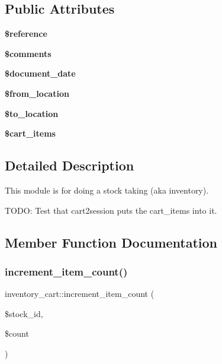 \subsection*{Public Attributes}
\begin{DoxyCompactItemize}
\item 
\hypertarget{classinventory__cart_adb6a248e9e7e1692096b86e0a46ea7d3}{}\label{classinventory__cart_adb6a248e9e7e1692096b86e0a46ea7d3} 
{\bfseries \$reference}
\item 
\hypertarget{classinventory__cart_afb8a0f36b69039235bce9a1533c52557}{}\label{classinventory__cart_afb8a0f36b69039235bce9a1533c52557} 
{\bfseries \$comments}
\item 
\hypertarget{classinventory__cart_aa6ec8ee5813e4dc2c5f4d4bcc86315cd}{}\label{classinventory__cart_aa6ec8ee5813e4dc2c5f4d4bcc86315cd} 
{\bfseries \$document\+\_\+date}
\item 
\hypertarget{classinventory__cart_a9f2fa9795e85409eb761c75010e7bf81}{}\label{classinventory__cart_a9f2fa9795e85409eb761c75010e7bf81} 
{\bfseries \$from\+\_\+location}
\item 
\hypertarget{classinventory__cart_a2e5e203494a0074bdee0b793b2cf38c1}{}\label{classinventory__cart_a2e5e203494a0074bdee0b793b2cf38c1} 
{\bfseries \$to\+\_\+location}
\item 
\hypertarget{classinventory__cart_a3612f3ff91eec58064ba266f07c501f9}{}\label{classinventory__cart_a3612f3ff91eec58064ba266f07c501f9} 
{\bfseries \$cart\+\_\+items}
\end{DoxyCompactItemize}


\subsection{Detailed Description}
This module is for doing a stock taking (aka inventory).

T\+O\+DO\+: Test that cart2session puts the cart\+\_\+items into it. 

\subsection{Member Function Documentation}
\hypertarget{classinventory__cart_af2060bcea0c8fd54ae0a2e5550a44935}{}\label{classinventory__cart_af2060bcea0c8fd54ae0a2e5550a44935} 
\subsubsection{\texorpdfstring{increment\+\_\+item\+\_\+count()}{increment\_item\_count()}}
{\footnotesize\ttfamily inventory\+\_\+cart\+::increment\+\_\+item\+\_\+count (\begin{DoxyParamCaption}\item[{}]{\$stock\+\_\+id,  }\item[{}]{\$count }\end{DoxyParamCaption})}

